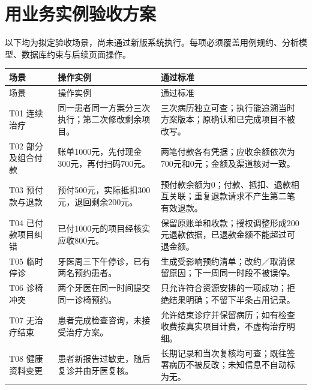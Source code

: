 \documentclass[UTF8,a4paper,zihao=-4,fontset=none]{ctexart}
\begin{document}
\clearpage\section{用业务实例验收方案}
以下均为拟定验收场景，尚未通过新版系统执行。每项必须覆盖用例规约、分析模型、数据库约束与后续页面操作。

{\small
\begin{longtable}{@{}p{2.3cm}p{5.3cm}p{7.9cm}@{}}
\toprule
场景 & 操作实例 & 通过标准 \\ \midrule
\endfirsthead
\toprule
场景 & 操作实例 & 通过标准 \\ \midrule
\endhead
\raggedright\arraybackslash T01 连续治疗 & \raggedright\arraybackslash 同一患者同一方案分三次执行；第二次修改剩余项目。 & \raggedright\arraybackslash 三次病历独立可查；执行能追溯当时方案版本；原确认和已完成项目不被改写。 \\[4pt]
\raggedright\arraybackslash T02 部分及组合付款 & \raggedright\arraybackslash 账单1000元，先付现金300元，再付扫码700元。 & \raggedright\arraybackslash 两笔付款各有凭据；应收余额依次为700元和0元；金额及渠道核对一致。 \\[4pt]
\raggedright\arraybackslash T03 预付款与退款 & \raggedright\arraybackslash 预付500元，实际抵扣300元，退回剩余200元。 & \raggedright\arraybackslash 预付款余额为0；付款、抵扣、退款相互关联；重复退款请求不产生第二笔有效退款。 \\[4pt]
\raggedright\arraybackslash T04 已付款项目纠错 & \raggedright\arraybackslash 已付1000元的项目经核实应收800元。 & \raggedright\arraybackslash 保留原账单和收款；授权调整形成200元退款依据，已退款金额不能超过可退金额。 \\[4pt]
\raggedright\arraybackslash T05 临时停诊 & \raggedright\arraybackslash 牙医周三下午停诊，已有两名预约患者。 & \raggedright\arraybackslash 生成受影响预约清单；改约／取消保留原因；下一周同一时段不被误停。 \\[4pt]
\raggedright\arraybackslash T06 诊椅冲突 & \raggedright\arraybackslash 两个牙医在同一时间提交同一诊椅预约。 & \raggedright\arraybackslash 只允许符合资源安排的一项成功；拒绝结果明确；不留下半条占用记录。 \\[4pt]
\raggedright\arraybackslash T07 无治疗结束 & \raggedright\arraybackslash 患者完成检查咨询，未接受治疗方案。 & \raggedright\arraybackslash 允许结束诊疗并保留病历；如有检查收费按真实项目计费，不虚构治疗明细。 \\[4pt]
\raggedright\arraybackslash T08 健康资料变更 & \raggedright\arraybackslash 患者新报告过敏史，随后复诊并由牙医复核。 & \raggedright\arraybackslash 长期记录和当次复核均可查；既往签署病历不被反改；未知信息不自动标为无。 \\[4pt]

\end{longtable}}
\end{document}
